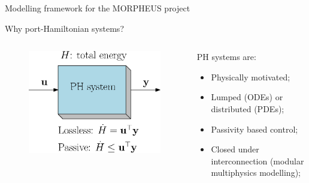 \documentclass{beamer}
\begin{document}
\begin{frame}{Modelling framework for the MORPHEUS project}
\end{frame}



\begin{frame}{Why port-Hamiltonian systems?}
		\begin{columns}
			\begin{column}{.45\textwidth}
				\begin{figure}
					\centering
					\includegraphics[width=.95\textwidth]{sketch_PH.eps}
				\end{figure}
			\end{column}
			\hspace{1cm}
			\begin{column}{.5\textwidth}
				PH systems are:
				\begin{itemize}
					\item Physically motivated;
					\item Lumped (ODEs) or distributed (PDEs);
					\item Passivity based control;
					\item \textcolor{theme}{Closed under interconnection (modular multiphysics modelling)};
				\end{itemize}
			\end{column}
		\end{columns}	
	
\end{frame}
\end{document}
